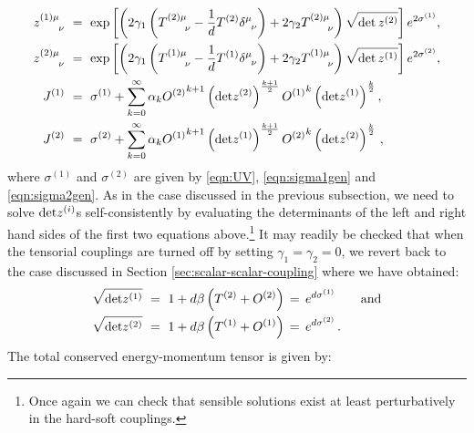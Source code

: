 \documentclass[prd,reprint,a4paper,showpacs,superscriptaddress,11pt,onecolumn,nofootinbib]{revtex4-1}
\renewcommand{\(}{\left(}
\renewcommand{\)}{\right)}
\newcommand{\6}{\partial}
\begin{document}
\begin{align}\label{tensor-scalar-couple}
z^{(1)\mu}_{\phantom{(1)\mu}\nu} ~ &= ~ \exp\left[\left(2\gamma_1\left(T^{(2)\mu}_{\phantom{(2)\mu}\nu}- \dfrac{1}{d} T^{(2)} \delta^\mu_{\phantom{\mu}\nu} \right)+2\gamma_2 T^{(2)\mu}_{\phantom{(2)\mu}\nu}\right)\sqrt{{\rm det}\, z^{(2)}}\right] e^{2\sigma^{(1)}}, \nonumber\\
z^{(2)\mu}_{\phantom{(2)\mu}\nu} ~ &= ~ \exp\left[\left(2\gamma_1\left(T^{(1)\mu}_{\phantom{(1)\mu}\nu}- \dfrac{1}{d} T^{(1)}\delta^\mu_{\phantom{\mu}\nu} \right)+2\gamma_2 T^{(1)\mu}_{\phantom{(1)\mu}\nu}\right)\sqrt{{\rm det}\, z^{(1)}}\right] e^{2\sigma^{(2)}}, \nonumber\\
J^{(1)} ~ &= ~ \sigma^{(1)}  + \sum_{k = 0}^\infty\alpha_k {O^{(2)}}^{k+1}\left({\rm det}z^{(2)}\right)^{\frac{k+1}{2}} {O^{(1)}}^k \left({\rm det}z^{(1)}\right)^{\frac{k}{2}}, \nonumber \\ 
J^{(2)} ~ &= ~ \sigma^{(2)} + \sum_{k = 0}^\infty\alpha_k {O^{(1)}}^{k+1}\left({\rm det}z^{(1)}\right)^{\frac{k+1}{2}} {O^{(2)}}^k \left({\rm det}z^{(2)}\right)^{\frac{k}{2}}\, ,
\end{align}
where $\sigma^{(1)}$ and $\sigma^{(2)}$ are given by \eqref{eqn:UV}, \eqref{eqn:sigma1gen} and \eqref{eqn:sigma2gen}. As in the case discussed in the previous subsection, we need to solve ${\rm det} z^{(i)}$s self-consistently by evaluating the determinants of the left and right hand sides of the first two equations above.\footnote{Once again we can check that sensible solutions exist at least perturbatively in the hard-soft couplings.} It may readily be checked that when the tensorial couplings are turned off by setting $\gamma_1 = \gamma_2 = 0$, we revert back to the case discussed in Section \ref{sec:scalar-scalar-coupling} where we have obtained:
\begin{align}
\sqrt{{\rm det} z^{(1)}} ~ &= ~ 1+ d\beta \left(T^{(2)} +O^{(2)}\right) \,=\, e^{d\sigma^{(1)}} \qquad \text{and} \nonumber \\
\sqrt{{\rm det} z^{(2)}} ~ &= ~ 1+ d\beta \left(T^{(1)} +O^{(1)}\right)\,=\, e^{d\sigma^{(2)}} \, . \nonumber
\end{align}
The total conserved energy-momentum tensor is given by:
\end{document}
